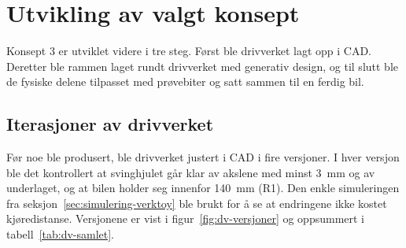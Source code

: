 \section{Utvikling av valgt konsept}
\label{sec:utvikling}
Konsept 3 er utviklet videre i tre steg. Først ble drivverket lagt opp i CAD. Deretter ble rammen laget rundt drivverket med generativ design, og til slutt ble de fysiske delene tilpasset med prøvebiter og satt sammen til en ferdig bil.

\subsection{Iterasjoner av drivverket}
\label{sec:dv-serien}
Før noe ble produsert, ble drivverket justert i CAD i fire versjoner. I hver versjon ble det kontrollert at svinghjulet går klar av akslene med minst \SI{3}{mm} og av underlaget, og at bilen holder seg innenfor \SI{140}{mm} (R1). Den enkle simuleringen fra seksjon~\ref{sec:simulering-verktoy} ble brukt for å se at endringene ikke kostet kjøredistanse. Versjonene er vist i figur~\ref{fig:dv-versjoner} og oppsummert i tabell~\ref{tab:dv-samlet}.

